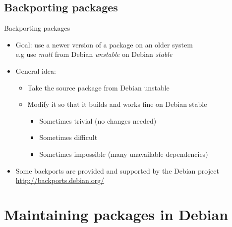 \documentclass[10pt,final]{beamer}
\begin{document}
\subsection{Backporting packages}
\begin{frame}{Backporting packages}
  \begin{itemize}
  \item Goal: use a newer version of a package on an older system\\
	  e.g use \textsl{mutt} from Debian \textsl{unstable} on Debian \textsl{stable}
	\br
  \item General idea:
	  \begin{itemize}
		\item Take the source package from Debian unstable
		\hbr
		\item Modify it so that it builds and works fine on Debian stable
		\begin{itemize}
			\item Sometimes trivial (no changes needed)
			\item Sometimes difficult
			\item Sometimes impossible (many unavailable dependencies)
		\end{itemize}
	\end{itemize}
	\br
   \item Some backports are provided and supported by the Debian project\\
	   \url{http://backports.debian.org/}
\end{itemize}
\end{frame}



\section{Maintaining packages in Debian}
\end{document}

